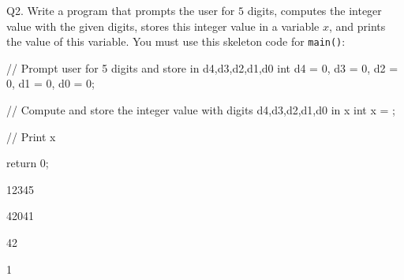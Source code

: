 Q2. Write a program that prompts the user for $5$ digits, computes the integer value with the given digits, stores this integer value in a variable $x$, and prints the value of this variable. You must use this skeleton code for \verb!main()!:

\begin{console}[commandchars=\\\{\}]
// Prompt user for 5 digits and store in d4,d3,d2,d1,d0
int d4 = 0, d3 = 0, d2 = 0, d1 = 0, d0 = 0;


// Compute and store the integer value with digits d4,d3,d2,d1,d0 in x
int x = \underline{                                                     };


// Print x

return 0;
\end{console}

\resett
\nextt
\begin{console}[commandchars=\\\{\}]
12345
\end{console}

\nextt
\begin{console}[commandchars=\\\{\}]
42041
\end{console}

\nextt
\begin{console}[commandchars=\\\{\}]
42
\end{console}

\nextt
\begin{console}[commandchars=\\\{\}]
1
\end{console}

